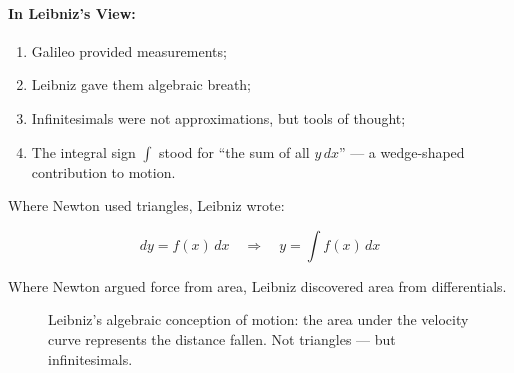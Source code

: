 \paragraph{In Leibniz's View:} 

\begin{enumerate}
	\item Galileo provided measurements;
	\item Leibniz gave them algebraic breath;
	\item Infinitesimals were not approximations, but tools of thought;
	\item The integral sign $\int$ stood for “the sum of all $y\,dx$” — a wedge-shaped contribution to motion.
\end{enumerate}

Where Newton used triangles, Leibniz wrote:

\[
dy = f(x)\,dx \quad \Rightarrow \quad y = \int f(x)\,dx
\]

Where Newton argued force from area, Leibniz discovered area from differentials.

\begin{figure}[H]
\centering
{}
\caption{Leibniz’s algebraic conception of motion: the area under the velocity curve represents the distance fallen. Not triangles — but infinitesimals.}
\end{figure}


